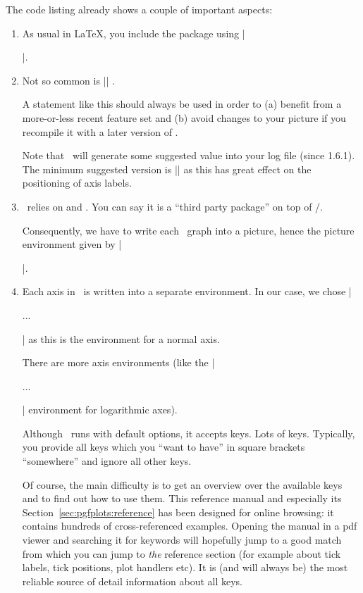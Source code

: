 The code listing already shows a couple of important aspects:
\begin{enumerate}
	\item As usual in \LaTeX, you include the package using |\usepackage{pgfplots}|.
	\item Not so common is |\pgfplotsset{compat=1.5}| . 
	
	A statement like this should always be used in order to (a) benefit from a more-or-less recent feature set and (b) avoid changes to your picture if you recompile it with a later version of \PGFPlots.

	Note that \PGFPlots\ will generate some suggested value into your log file (since 1.6.1). The minimum suggested version is |\pgfplotsset{compat=1.3}| as this has great effect on the positioning of axis labels.
	
	\item \PGFPlots\ relies on \Tikz and \pgfname. You can say it is a ``third party package'' on top of \Tikz/\pgfname.
	
	Consequently, we have to write each \PGFPlots\ graph into a \Tikz{} picture, hence the picture environment given by ||.
	\item
		Each axis in \PGFPlots\ is written into a separate environment. In our case, we chose |\begin{axis} ... \end{axis}| as this is the environment for a normal axis.

		There are more axis environments (like the |\begin{loglogaxis} ... \end{loglogaxis}| environment for logarithmic axes).

		Although \PGFPlots\ runs with default options, it accepts keys. Lots of keys. Typically, you provide all keys which you ``want to have'' in square brackets ``somewhere'' and ignore all other keys. 
		
		Of course, the main difficulty is to get an overview over the available keys and to find out how to use them. This reference manual and especially its Section~\ref{sec:pgfplots:reference} has been designed for online browsing: it contains hundreds of cross-referenced examples. Opening the manual in a pdf viewer and searching it for keywords will hopefully jump to a good match from which you can jump to \emph{the} reference section (for example about tick labels, tick positions, plot handlers etc). It is (and will always be) the most reliable source of detail information about all keys.
		

\end{enumerate}
